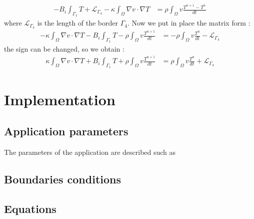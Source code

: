 \begin{equation}
   \begin{split}
      \displaystyle{- B_i \int_{\Gamma_1}{T} + \mathcal{L}_{\Gamma_4} - \kappa \int_\varOmega {\nabla v \cdot \nabla T} }  & = \displaystyle{\rho \int_\varOmega v\frac{ T^{n+1} - T^{n}}{dt}}
  \end{split}
\end{equation}
where $\mathcal{L}_{\Gamma_4}$ is the length of the border $\Gamma_4$. Now we put in place the matrix form :
\begin{equation}
   \begin{split}
	\displaystyle{ - \kappa \int_\varOmega {\nabla v \cdot \nabla T}  - B_i \int_{\Gamma_1}{T}   - \rho \int_\varOmega v\frac{ T^{n+1} }{ dt }       } & = 
		\displaystyle{    - \rho \int_\varOmega v\frac{ T^{n} }{ dt }  - \mathcal{L}_{\Gamma_4}      }  
  \end{split}
\end{equation}
the sign can be changed, so we obtain :
\begin{equation}
   \begin{split}
	\displaystyle{ \kappa \int_\varOmega {\nabla v \cdot \nabla T}  + B_i \int_{\Gamma_1}{T}   + \rho \int_\varOmega v\frac{ T^{n+1} }{ dt }       } & = 
		\displaystyle{   \rho \int_\varOmega v\frac{ T^{n} }{ dt }  + \mathcal{L}_{\Gamma_4}      }  
  \end{split}
\end{equation}

\section{Implementation}
\label{heat:impl}

\subsection{Application parameters}
\label{heat:param}

The parameters of the application are described such as 


\subsection{Boundaries conditions}
\label{heat:bc_impl}

\subsection{Equations}
\label{heat:eq_impl}

